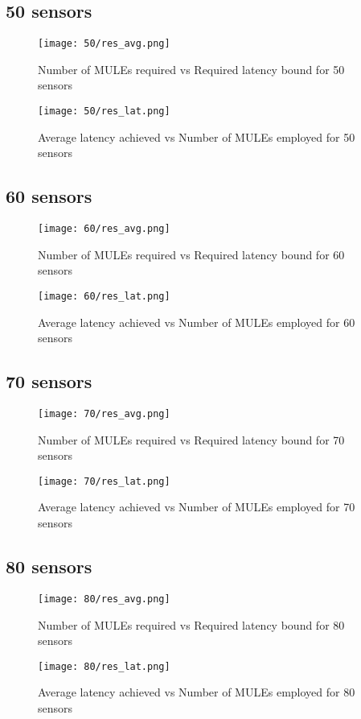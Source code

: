 \pagebreak

\subsection{50 sensors}
\begin{figure}[H]
\texttt{[image: 50/res\_avg.png]}
\caption{Number of MULEs required vs Required latency bound for 50 sensors}
\end{figure}
\begin{figure}[H]
\texttt{[image: 50/res\_lat.png]}
\caption{Average latency achieved vs Number of MULEs employed for 50 sensors}
\end{figure}
\subsection{60 sensors}
\begin{figure}[H]
\texttt{[image: 60/res\_avg.png]}
\caption{Number of MULEs required vs Required latency bound for 60 sensors}
\end{figure}
\begin{figure}[H]
\texttt{[image: 60/res\_lat.png]}
\caption{Average latency achieved vs Number of MULEs employed for 60 sensors}
\end{figure}

\subsection{70 sensors}
\begin{figure}[H]
\texttt{[image: 70/res\_avg.png]}
\caption{Number of MULEs required vs Required latency bound for 70 sensors}
\end{figure}
\begin{figure}[H]
\texttt{[image: 70/res\_lat.png]}
\caption{Average latency achieved vs Number of MULEs employed for 70 sensors}
\end{figure}

\subsection{80 sensors}
\begin{figure}[H]
\texttt{[image: 80/res\_avg.png]}
\caption{Number of MULEs required vs Required latency bound for 80 sensors}
\end{figure}
\begin{figure}[H]
\texttt{[image: 80/res\_lat.png]}
\caption{Average latency achieved vs Number of MULEs employed for 80 sensors}
\end{figure}

